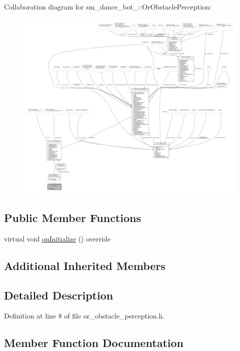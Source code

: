 Collaboration diagram for sm\+\_\+dance\+\_\+bot\+\_\+:\+:Or\+Obstacle\+Perception\+:
\nopagebreak
\begin{figure}[H]
\begin{center}
\leavevmode
\includegraphics[width=350pt]{classsm__dance__bot__2_1_1OrObstaclePerception__coll__graph}
\end{center}
\end{figure}
\subsection*{Public Member Functions}
\begin{DoxyCompactItemize}
\item 
virtual void \hyperlink{classsm__dance__bot__2_1_1OrObstaclePerception_a0c38cec76ed524ffa25c0cd305966045}{on\+Initialize} () override
\end{DoxyCompactItemize}
\subsection*{Additional Inherited Members}


\subsection{Detailed Description}


Definition at line 8 of file or\+\_\+obstacle\+\_\+perception.\+h.



\subsection{Member Function Documentation}
\mbox{\label{classsm__dance__bot__2_1_1OrObstaclePerception_a0c38cec76ed524ffa25c0cd305966045}} 
